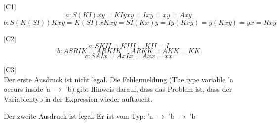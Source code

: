 \documentclass{article}
\begin{document}
[C1]
$$
a: S(KI)xy = KIyxy = Ixy = xy = Axy 
$$
$$
b: S(K(SI))Kxy = K(SI)xKxy = SI(Kx)y = Iy(Kxy) = y(Kxy) = yx = Rxy
$$

[C2]
$$ a: SKII = KIII = KII = I $$
$$ b: ASRIK = ARKIK = ARKK = AKK = KK $$
$$ c: SAIx = AxIx = Axx = xx $$

[C3] \\ 
Der erste Ausdruck ist nicht legal. Die Fehlermeldung (The type variable 'a occurs inside 'a $\rightarrow$ 'b) gibt Hinweis darauf, dass das Problem ist, dass der Variablentyp in der Expression wieder auftaucht.

Der zweite Ausdruck ist legal. Er ist vom Typ:
'a $\rightarrow$ 'b $\rightarrow$ 'b
\end{document}
